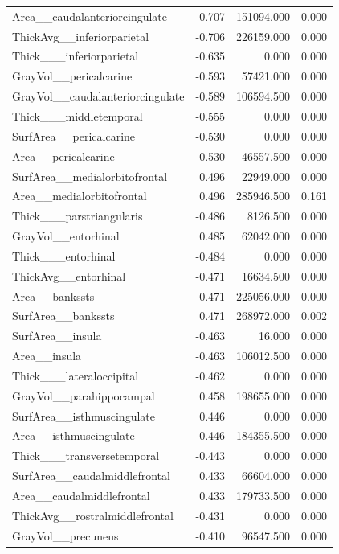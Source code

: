 \documentclass{article}
\begin{document}
\begin{longtable}{lrrr}
	Area\_\_caudalanteriorcingulate & -0.707 & 151094.000 & 0.000 \\
	ThickAvg\_\_inferiorparietal & -0.706 & 226159.000 & 0.000 \\
	Thick\_\_\_inferiorparietal & -0.635 & 0.000 & 0.000 \\
	GrayVol\_\_pericalcarine & -0.593 & 57421.000 & 0.000 \\
	GrayVol\_\_caudalanteriorcingulate & -0.589 & 106594.500 & 0.000 \\
	Thick\_\_\_middletemporal & -0.555 & 0.000 & 0.000 \\
	SurfArea\_\_pericalcarine & -0.530 & 0.000 & 0.000 \\
	Area\_\_pericalcarine & -0.530 & 46557.500 & 0.000 \\
	SurfArea\_\_medialorbitofrontal & 0.496 & 22949.000 & 0.000 \\
	Area\_\_medialorbitofrontal & 0.496 & 285946.500 & 0.161 \\
	Thick\_\_\_parstriangularis & -0.486 & 8126.500 & 0.000 \\
	GrayVol\_\_entorhinal & 0.485 & 62042.000 & 0.000 \\
	Thick\_\_\_entorhinal & -0.484 & 0.000 & 0.000 \\
	ThickAvg\_\_entorhinal & -0.471 & 16634.500 & 0.000 \\
	Area\_\_bankssts & 0.471 & 225056.000 & 0.000 \\
	SurfArea\_\_bankssts & 0.471 & 268972.000 & 0.002 \\
	SurfArea\_\_insula & -0.463 & 16.000 & 0.000 \\
	Area\_\_insula & -0.463 & 106012.500 & 0.000 \\
	Thick\_\_\_lateraloccipital & -0.462 & 0.000 & 0.000 \\
	GrayVol\_\_parahippocampal & 0.458 & 198655.000 & 0.000 \\
	SurfArea\_\_isthmuscingulate & 0.446 & 0.000 & 0.000 \\
	Area\_\_isthmuscingulate & 0.446 & 184355.500 & 0.000 \\
	Thick\_\_\_transversetemporal & -0.443 & 0.000 & 0.000 \\
	SurfArea\_\_caudalmiddlefrontal & 0.433 & 66604.000 & 0.000 \\
	Area\_\_caudalmiddlefrontal & 0.433 & 179733.500 & 0.000 \\
	ThickAvg\_\_rostralmiddlefrontal & -0.431 & 0.000 & 0.000 \\
	GrayVol\_\_precuneus & -0.410 & 96547.500 & 0.000 \\

\end{longtable}
\end{document}

